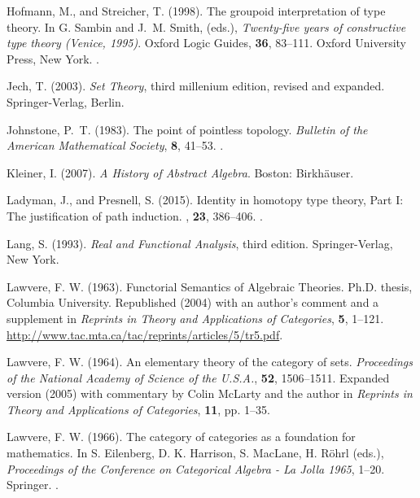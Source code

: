 \documentclass[11pt]{article}
\begin{document}
\begin{thebibliography}{}
Hofmann, M., and Streicher, T. (1998).
\newblock The groupoid interpretation of type theory.
\newblock In G. Sambin and J.~M. Smith, (eds.),
    \emph{Twenty-five years of constructive type theory (Venice, 1995)}.
\newblock Oxford Logic Guides, \textbf{36}, 83--111.
\newblock Oxford University Press, New York.
\newblock {}.

Jech, T. (2003).
\newblock \emph{Set Theory}, third millenium edition, revised and expanded.
\newblock Springer-Verlag, Berlin.

Johnstone, P.~T. (1983).
\newblock The point of pointless topology.
\newblock \emph{Bulletin of the American Mathematical Society},
    \textbf{8}, 41--53.
\newblock {}.

Kleiner, I. (2007).
\newblock \emph{A History of Abstract Algebra}.
\newblock Boston: Birkh\"{a}user.

Ladyman, J., and Presnell, S. (2015).
\newblock Identity in homotopy type theory, Part I: The justification of
    path induction.
, \textbf{23}, 386--406.
\newblock {}.

Lang, S. (1993).
\newblock \emph{Real and Functional Analysis}, third edition.
\newblock Springer-Verlag, New York.

Lawvere, F. W. (1963).
\newblock Functorial Semantics of Algebraic Theories.
\newblock Ph.D. thesis, Columbia University.
\newblock Republished (2004) with an author’s comment and a supplement in
    \emph{Reprints in Theory and Applications of Categories}, \textbf{5},
    1--121.
\newblock \url{http://www.tac.mta.ca/tac/reprints/articles/5/tr5.pdf}.

Lawvere, F. W. (1964).
\newblock An elementary theory of the category of sets.
\newblock \emph{Proceedings of the National Academy of Science of the U.S.A.},
    \textbf{52}, 1506--1511.
\newblock Expanded version (2005) with commentary by Colin McLarty and
    the author in \emph{Reprints in Theory and Applications of Categories},
    \textbf{11}, pp. 1--35.

Lawvere, F. W. (1966).
\newblock The category of categories as a foundation for mathematics.
\newblock In S. Eilenberg, D. K. Harrison, S. MacLane, H. Röhrl (eds.),
    \emph{Proceedings of the Conference on Categorical Algebra - La Jolla
    1965}, 1--20.
\newblock Springer.
\newblock {}.


\end{thebibliography}
\end{document}
